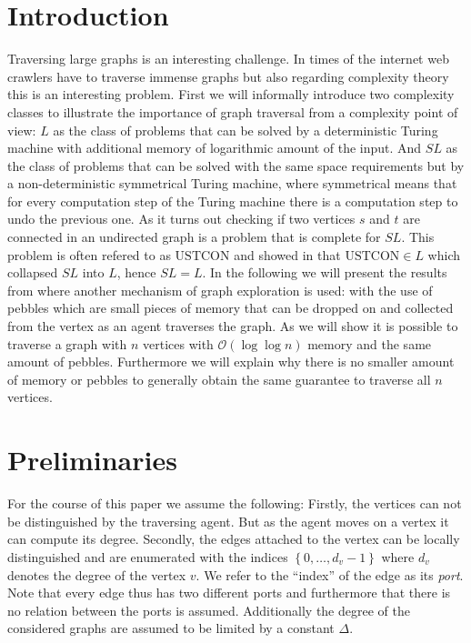 \documentclass[draft,oneside]{scrartcl}
\begin{document}
\section{Introduction}
Traversing large graphs is an interesting challenge. In times of the internet
web crawlers have to traverse immense graphs but also regarding complexity
theory this is an interesting problem. First we will informally introduce two
complexity classes to illustrate the importance of graph traversal from a
complexity point of view: $L$ as the class of problems that can be solved by
a deterministic Turing machine with additional memory of logarithmic amount
of the input. And $SL$ as the class of problems that can be solved with the
same space requirements but by a non-deterministic symmetrical Turing machine,
where symmetrical means that for every computation step of the Turing machine
there is a computation step to undo the previous one. As it turns out checking
if two vertices $s$ and $t$ are connected in an undirected graph is a problem
that is complete for $SL$. This problem is often refered to as
$\mathrm{USTCON}$ and \citeauthor{logspacealg} showed in \cite{logspacealg}
that $\mathrm{USTCON}\in L$ which collapsed $SL$ into $L$, hence $SL = L$.
In the following we will present the results from \cite{pebbles} where another
mechanism of graph exploration is used: with the use of pebbles which are small
pieces of memory that can be dropped on and collected from the vertex as an
agent traverses the graph. As we will show it is possible to traverse a graph
with $n$ vertices with $\mathcal{O}(\log\log n)$ memory and the same amount of
pebbles. Furthermore we will explain why there is no smaller amount of memory
or pebbles to generally obtain the same guarantee to traverse all $n$ vertices.

\section{Preliminaries}
For the course of this paper we assume the following: Firstly, the vertices can
not be distinguished by the traversing agent. But as the agent moves on a
vertex it can compute its degree. Secondly, the edges attached to the vertex
can be locally distinguished and are enumerated with the indices
$\left\{0,\dots,d_{v}-1\right\}$ where $d_{v}$ denotes the degree of the vertex
$v$. We refer to the \enquote{index} of the edge as its \emph{port}. Note that
every edge thus has two different ports and furthermore that there is no
relation between the ports is assumed. Additionally the degree of the
considered graphs are assumed to be limited by a constant $\Delta$.
\end{document}
